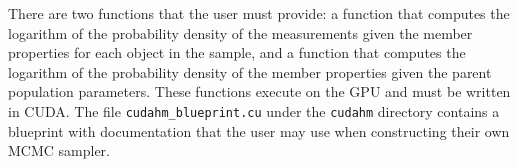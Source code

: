 There are two functions that the user must provide: a function that computes the logarithm of the probability density of the measurements given the member properties for each object in the sample, and a function that computes the logarithm of the probability density of the member properties given the parent population parameters.
These functions execute on the GPU and must be written in CUDA.
The file \texttt{cudahm\_blueprint.cu} under the \texttt{cudahm} directory contains a blueprint with documentation that the user may use when constructing their own MCMC sampler.
